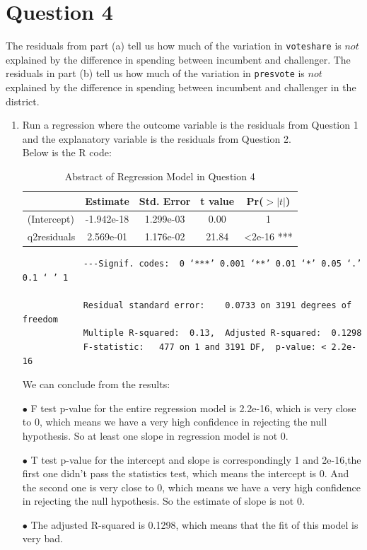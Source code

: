 \documentclass[12pt,letterpaper]{article}
\begin{document}
\newpage	
\section*{Question 4}
\noindent The residuals from part (a) tell us how much of the variation in \texttt{voteshare} is $not$ explained by the difference in spending between incumbent and challenger. The residuals in part (b) tell us how much of the variation in \texttt{presvote} is $not$ explained by the difference in spending between incumbent and challenger in the district.
	\begin{enumerate}
		\item Run a regression where the outcome variable is the residuals from Question 1 and the explanatory variable is the residuals from Question 2.\\
		
		Below is the R code:
		
		
		\begin{table}[ht]
			\centering
			\caption{Abstract of Regression Model in Question 4}
			\begin{tabular}{lcccc}
				\toprule
				& Estimate & Std. Error & t value & Pr($>|t|$) \\
				\midrule
				(Intercept) & -1.942e-18 &1.299e-03 & 0.00 & 1 \\
				q2residuals & 2.569e-01 & 1.176e-02 & 21.84 & <2e-16 *** \\
				\bottomrule
			\end{tabular} 
		\end{table}
		\begin{verbatim}
			---Signif. codes:  0 ‘***’ 0.001 ‘**’ 0.01 ‘*’ 0.05 ‘.’ 0.1 ‘ ’ 1
			
			Residual standard error: 	0.0733 on 3191 degrees of freedom
			Multiple R-squared:  0.13,	Adjusted R-squared:  0.1298 
			F-statistic:   477 on 1 and 3191 DF,  p-value: < 2.2e-16
		\end{verbatim}
		We can conclude from the results:
		\item[$\bullet$] F test p-value for the entire regression model is 2.2e-16, which is very close to 0, which means we have a very high confidence in rejecting the null hypothesis. So at least one slope in regression model is not 0.
		\item[$\bullet$] T test p-value for the intercept and slope is correspondingly 1 and 2e-16,the first one didn't pass the statistics test, which means the intercept is 0. And the second one is very close to 0,  which means we have a very high confidence in rejecting the null hypothesis. So the estimate of slope is not 0.
		\item[$\bullet$] The adjusted R-squared is 0.1298, which means that the fit of this model is very bad.
		

\end{enumerate}
\end{document}

